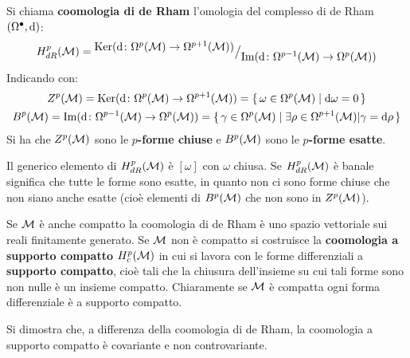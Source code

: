 \begin{definition}
  Si chiama \textbf{coomologia di de Rham}
  l'omologia del complesso di de Rham $ (\Omega^\bullet, \operatorname{d}\!{}) $:
  \[
    H^p_{dR}(\mathcal{M}) = {^{\textstyle \mathrm{Ker}(  \operatorname{d}\!{} \colon \Omega^p(\mathcal{M}) \to \Omega^{p+1}(\mathcal{M}))}\big/_{\textstyle \mathrm{Im}( \operatorname{d}\!{} \colon \Omega^{p-1}(\mathcal{M}) \to \Omega^p(\mathcal{M}) )}}
  \]
  Indicando con:
  \begin{gather*}
    Z^p(\mathcal{M}) = \mathrm{Ker}(  \operatorname{d}\!{} \colon \Omega^p(\mathcal{M}) \to \Omega^{p+1}(\mathcal{M})) = \set{\omega \in \Omega^p(\mathcal{M}) | \ensuremath{\operatorname{d}\!{\omega}} = 0} \\
    B^p(\mathcal{M}) = \mathrm{Im}( \operatorname{d}\!{} \colon \Omega^{p-1}(\mathcal{M}) \to \Omega^p(\mathcal{M}) ) = \set{\gamma \in \Omega^p(\mathcal{M}) | \exists \rho \in \Omega^{p+1}(\mathcal{M}) | \gamma = \ensuremath{\operatorname{d}\!{\rho}}}
  \end{gather*}
  Si ha che $ Z^p(\mathcal{M}) $ sono le  \textbf{$ p $-forme chiuse} e $ B^p(\mathcal{M}) $ sono
  le \textbf{ $ p $-forme esatte}.
\end{definition}
Il generico elemento di $ H^p_{dR}(\mathcal{M}) $ è $ [\omega] $ con $ \omega $ chiusa. Se
$ H^p_{dR}(\mathcal{M}) $ è banale significa che tutte le forme sono esatte, in quanto
non ci sono forme chiuse che non siano anche esatte (cioè elementi di
$ B^p(\mathcal{M}) $ che non sono in $ Z^p(\mathcal{M}) $).
\begin{osservation}
  Se $ \mathcal{M} $ è anche compatto la coomologia di de Rham è uno spazio vettoriale
  sui reali finitamente generato. Se $ \mathcal{M} $ non è compatto si costruisce la
  \textbf{coomologia a supporto compatto}
  $ H^p_c(\mathcal{M}) $ in cui si lavora con le forme differenziali a \textbf{supporto
    compatto}, cioè tali che la chiusura dell'insieme
  su cui tali forme sono non nulle è un insieme compatto. Chiaramente se $ \mathcal{M} $ è
  compatta ogni forma differenziale è a supporto compatto.
\end{osservation}
\begin{lemma}
  Si dimostra che, a differenza della coomologia di de Rham, la coomologia a supporto
  compatto è covariante e non controvariante.
\end{lemma}

